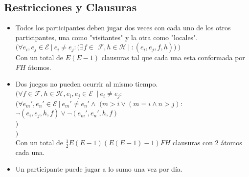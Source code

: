 \documentclass[a4paper,10pt]{article}
\newcommand{\tab}{\hspace*{0.5cm}}
\begin{document}
  \subsection{Restricciones y Clausuras}
    \begin{itemize}
      \item Todos los participantes deben jugar dos veces con cada uno de los 
      otros participantes, una como "visitantes" y la otra como "locales". \\

      $(\forall e_i, e_j \in \mathcal{E} \: | \: e_i \neq e_j : (\exists f \in $
      $\mathcal{F}, h \in \mathcal{H} \: | \: : (e_i, e_j, f, h)) \: )$ \\

      Con un total de $E(E-1)$ clausuras tal que cada una esta conformada 
      por $FH$ \'atomos.\\

      \item Dos juegos no pueden ocurrir al mismo tiempo.\\
      
      $(\forall f \in \mathcal{F}, h \in \mathcal{H}, e_i, e_j \in \mathcal{E} $
      $\: | \: e_i \neq e_j :$\\
      \tab $(\forall e_m', e_n' \in \mathcal{E} \: | \: e_m' \neq e_n' \wedge $
      $(m > i \vee (m = i \wedge n > j) : $\\
      \tab \tab $\neg (e_i, e_j, h, f) \vee \neg (e_m', e_n', h, f)$ \\
      \tab $)$\\
      $)$ \\

      Con un total de $\frac{1}{2}E(E-1)(E(E-1)-1)FH$ clausuras con 2 
      \'atomos cada una.\\


      \item Un participante puede jugar a lo sumo una vez por día. \\
      

\end{itemize}
\end{document}
